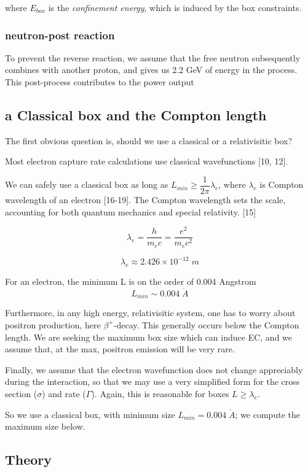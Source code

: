 \documentclass[11pt]{amsart}
\begin{document}
where $E_{box}$ is the \emph{confinement energy}, which is induced by the box constraints. 

\subsubsection{neutron-post reaction}

To prevent the reverse reaction, we assume that the free neutron subsequently combines with another proton, and gives us 2.2 GeV of energy in the process.  This post-process contributes to the power output

\subsection{a Classical box and the Compton length}
The first obvious question is, should we use a classical or a relativisitic box?   

Most electron capture rate calculations use classical wavefunctions [10, 12].  

We can safely use a classical box as long as $L_{min} \ge \dfrac{1}{2\pi}\lambda_{e}$, where $\lambda_{e}$ is Compton wavelength of an electron [16-19].  The Compton wavelength sets the scale, accounting for both quantum mechanics and special relativity. [15]

$$\lambda_{e}=\dfrac{h}{m_{e}c}=\dfrac{e^{2}}{m_{e}c^{2}}$$

$$\lambda_{e}\approx2.426\times 10^{-12}\;m$$

For an electron, the minimum L is on the order of 0.004 Angstrom 
$$L_{min}\sim0.004\;\mathring{A}$$ 

Furthermore, in any high energy, relativisitic system, one has to worry about positron production, here $\beta^{+}$-decay. This generally occurs below the Compton length. We are seeking the maximum box size which can induce EC, and we assume that, at the max, positron emission will be very rare.

Finally, we assume that the electron wavefunction does not change appreciably during the interaction, so that we may use a very simplified form for the cross section ($\sigma$) and rate ($\Gamma$).  Again, this is reasonable for boxes $L\ge\lambda_{e}$.

So we use a classical box, with minimum size $L_{min}=0.004\;\mathring{A}$; we compute the maximum size below.

\subsection{Theory}
\end{document}
